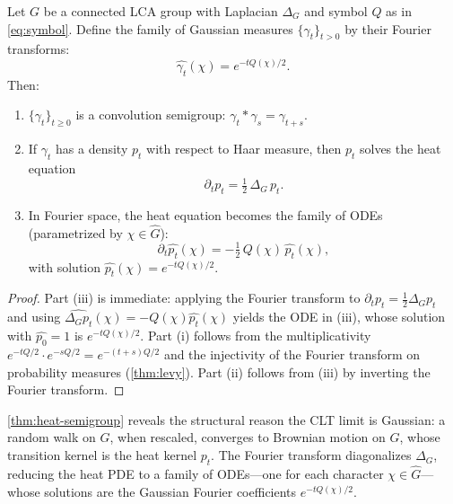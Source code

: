\begin{theorem}\label{thm:heat-semigroup}
Let $G$ be a connected LCA group with Laplacian $\Delta_G$ and symbol $Q$ as in \eqref{eq:symbol}. Define the family of Gaussian measures $\{\gamma_t\}_{t > 0}$ by their Fourier transforms:
\[
\widehat{\gamma_t}(\chi) = e^{-tQ(\chi)/2}.
\]
Then:
\begin{enumerate}[label=(\roman*)]
\item $\{\gamma_t\}_{t \geq 0}$ is a convolution semigroup: $\gamma_t * \gamma_s = \gamma_{t+s}$.
\item If $\gamma_t$ has a density $p_t$ with respect to Haar measure, then $p_t$ solves the heat equation
\[
\partial_t p_t = \tfrac{1}{2}\,\Delta_G\, p_t.
\]
\item In Fourier space, the heat equation becomes the family of ODEs (parametrized by $\chi \in \widehat{G}$):
\[
\partial_t \widehat{p_t}(\chi) = -\tfrac{1}{2}\, Q(\chi)\, \widehat{p_t}(\chi),
\]
with solution $\widehat{p_t}(\chi) = e^{-tQ(\chi)/2}$.
\end{enumerate}
\end{theorem}

\begin{proof}
Part (iii) is immediate: applying the Fourier transform to $\partial_t p_t = \frac{1}{2}\Delta_G p_t$ and using $\widehat{\Delta_G p_t}(\chi) = -Q(\chi)\widehat{p_t}(\chi)$ yields the ODE in (iii), whose solution with $\widehat{p_0} = 1$ is $e^{-tQ(\chi)/2}$. Part (i) follows from the multiplicativity $e^{-tQ/2} \cdot e^{-sQ/2} = e^{-(t+s)Q/2}$ and the injectivity of the Fourier transform on probability measures (\cref{thm:levy}). Part (ii) follows from (iii) by inverting the Fourier transform.
\end{proof}

\begin{remark}\label{rmk:heat-clt}
\cref{thm:heat-semigroup} reveals the structural reason the CLT limit is Gaussian: a random walk on $G$, when rescaled, converges to Brownian motion on $G$, whose transition kernel is the heat kernel $p_t$. The Fourier transform diagonalizes $\Delta_G$, reducing the heat PDE to a family of ODEs---one for each character $\chi \in \widehat{G}$---whose solutions are the Gaussian Fourier coefficients $e^{-tQ(\chi)/2}$.
\end{remark}

